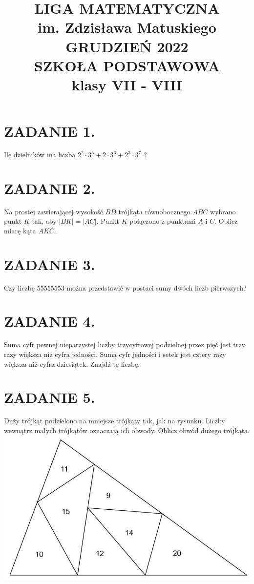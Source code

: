 \documentclass[10pt]{article}
\title{LIGA MATEMATYCZNA \\
 im. Zdzisława Matuskiego \\
 GRUDZIEŃ 2022 \\
 SZKOŁA PODSTAWOWA \\
 klasy VII - VIII }
\author{}
\date{}
\begin{document}
\maketitle
\section*{ZADANIE 1.}
Ile dzielników ma liczba \(2^{2} \cdot 3^{5}+2 \cdot 3^{6}+2^{3} \cdot 3^{7}\) ?

\section*{ZADANIE 2.}
Na prostej zawierającej wysokość \(B D\) trójkąta równobocznego \(A B C\) wybrano punkt \(K\) tak, aby \(|B K|=|A C|\). Punkt \(K\) połączono z punktami \(A\) i \(C\). Oblicz miarę kąta \(A K C\).

\section*{ZADANIE 3.}
Czy liczbę 55555553 można przedstawić w postaci sumy dwóch liczb pierwszych?

\section*{ZADANIE 4.}
Suma cyfr pewnej nieparzystej liczby trzycyfrowej podzielnej przez pięć jest trzy razy większa niż cyfra jedności. Suma cyfr jedności i setek jest cztery razy większa niż cyfra dziesiątek. Znajdź tę liczbę.

\section*{ZADANIE 5.}
Duży trójkąt podzielono na mniejsze trójkąty tak, jak na rysunku. Liczby wewnątrz małych trójkątów oznaczają ich obwody. Oblicz obwód dużego trójkąta.\\
\includegraphics[max width=\textwidth, center]{2024_11_21_fdad45e33c34501d05e2g-1}
\end{document}
